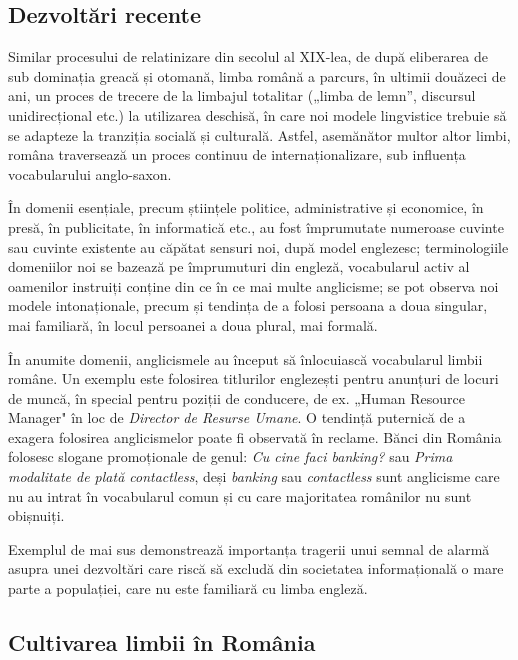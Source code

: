 \begin{multicols}{2}
\subsection{Dezvoltări recente}

Similar procesului de relatinizare din secolul al \mbox{XIX-lea}, de după eliberarea de sub dominația greacă și otomană, limba română a parcurs, în ultimii douăzeci de ani, un proces de trecere de la limbajul totalitar („limba de lemn”, discursul unidirecțional etc.) la utilizarea deschisă, în care noi modele lingvistice trebuie să se adapteze la tranziția socială și culturală. Astfel, asemănător multor altor limbi, româna traversează un proces continuu de internaționalizare, sub influența vocabularului anglo-saxon.

În domenii esențiale, precum științele politice, administrative și economice, în presă, în publicitate, în informatică etc., au fost împrumutate numeroase cuvinte sau cuvinte existente au căpătat sensuri noi, după model englezesc; terminologiile domeniilor noi se bazează pe împrumuturi din engleză, vocabularul activ al oamenilor instruiți conține din ce în ce mai multe anglicisme; se pot observa noi modele intonaționale, precum și tendința de a folosi persoana a doua singular, mai familiară, în locul persoanei a doua plural, mai formală.

În anumite domenii, anglicismele au început să înlocuiască vocabularul limbii române. Un exemplu este folosirea titlurilor englezești pentru anunțuri de locuri de muncă, în special pentru poziții de conducere, de ex. „Human Resource Manager" în loc de \textit{Director de Resurse Umane}. O tendință puternică de a exagera folosirea anglicismelor poate fi observată în reclame. Bănci din România folosesc slogane promoționale de genul: \textit{Cu cine faci banking?} sau \textit{Prima modalitate de plată contactless}, deși \textit{banking} sau \textit{contactless} sunt anglicisme care nu au intrat în vocabularul comun și cu care majoritatea românilor nu sunt obișnuiți.

Exemplul de mai sus demonstrează importanța tragerii unui semnal de alarmă asupra unei dezvoltări care riscă să excludă din societatea informațională o mare parte a populației, care nu este familiară cu limba engleză.

\subsection{Cultivarea limbii în România}


\end{multicols}
